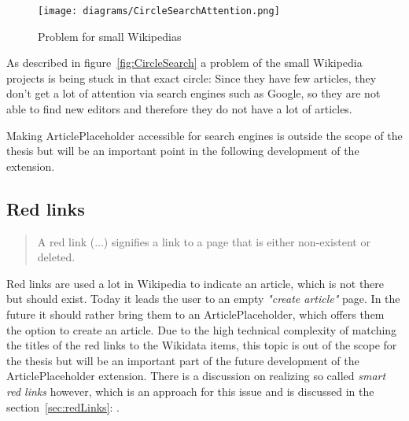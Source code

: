\noindent\begin{minipage}{.4\textwidth}
	\begin{figure}[H]\label{fig:CircleSearch}
		\texttt{[image: diagrams/CircleSearchAttention.png]}
		\caption{Problem for small Wikipedias}
		\label{diagramCircleSearch}
	\end{figure}
	\hspace*{1cm}
\end{minipage}
\hfill
\begin{minipage}{0.5\textwidth}
		As described in figure~\ref{fig:CircleSearch} a problem of the small Wikipedia projects is being stuck in that exact circle: Since they have few articles, they don't get a lot of attention via search engines such as Google, so they are not able to find new editors and therefore they do not have a lot of articles.
\end{minipage}
\newline
Making ArticlePlaceholder accessible for search engines is outside the scope of the thesis but will be an important point in the following development of the extension. 

\subsection{Red links}
\begin{quotation}
A red link (...) signifies a link to a page that is either non-existent or deleted. 
\end{quotation} %

Red links are used a lot in Wikipedia to indicate an article, which is not there but should exist. Today it leads the user to an empty \textit{"create article"} page. In the future it should rather bring them to an ArticlePlaceholder, which offers them the option to create an article. Due to the high technical complexity of matching the titles of the red links to the Wikidata items, this topic is out of the scope for the thesis but will be an important part of the future development of the ArticlePlaceholder extension. There is a discussion on realizing so called \textit{smart red links} however, which is an approach for this issue and is discussed in the section~\ref{sec:redLinks}: .

